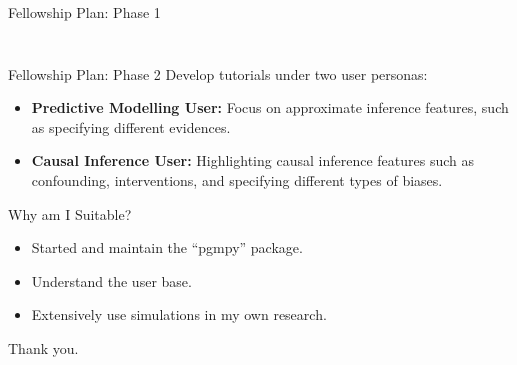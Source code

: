 \documentclass{beamer}
\begin{document}
\begin{frame}[fragile]{Fellowship Plan: Phase 1}
\begin{columns}
\begin{column}{0.4\textwidth}
\begin{figure}
			\end{figure}
		\end{column}
	\end{columns}
\end{frame}

\begin{frame}{Fellowship Plan: Phase 2}
	Develop tutorials under two user personas:

	\vspace{2em}

	\begin{itemize}
		\item \textbf{Predictive Modelling User:} Focus on approximate inference features, such as specifying different evidences.
		\vspace{1em}
		\item \textbf{Causal Inference User:} Highlighting causal inference features such as confounding, interventions, and specifying different types of biases.
	\end{itemize}
\end{frame}

\begin{frame}{Why am I Suitable?}
	\begin{itemize}
		\item Started and maintain the ``pgmpy'' package.
		\item Understand the user base. 
		\item Extensively use simulations in my own research.
	\end{itemize}
\end{frame}

\begin{frame}
	\huge{Thank you.}
\end{frame}
\end{document}
